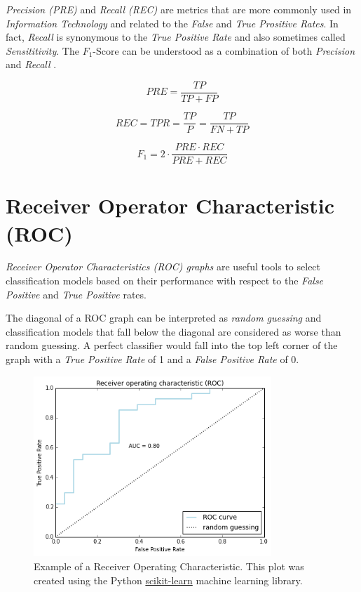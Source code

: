 \documentclass{article}
\begin{document}
\emph{Precision (PRE)} and \emph{Recall (REC)} are metrics that are more commonly used in \emph{Information Technology} and related to the \emph {False} and \emph{True Prositive Rates}. In fact, \emph{Recall} is synonymous to the \emph{True Positive Rate} and also sometimes called \emph{Sensititivity}. The $F_1$-Score can be understood as a combination of both \emph{Precision} and \emph{Recall} \cite{goutte2005probabilistic}.

\begin{equation} PRE = \frac{TP}{TP + FP} \end{equation}

\begin{equation} REC = TPR = \frac{TP}{P} =  \frac{TP}{FN + TP} \end{equation}

\begin{equation} F_1 = 2 \cdot \frac{PRE \cdot REC}{PRE + REC}\end{equation}


\section{Receiver Operator Characteristic (ROC)}

\emph{Receiver Operator Characteristics (ROC) graphs} are useful tools to select classification models based on their performance with respect to the \emph{False Positive} and \emph{True Positive} rates. 


The diagonal of a ROC graph can be interpreted as \emph{random guessing} and classification models that fall below the diagonal are considered as worse than random guessing. A perfect classifier would fall into the top left corner of the graph with a \emph{True Positive Rate} of 1 and a  \emph{False Positive Rate} of 0.

\begin{figure}[h!]
    \centering
    \includegraphics[width=0.8\textwidth]{./plot/roc.png}
    \caption{Example of a Receiver Operating Characteristic. This plot was created using the Python \href{http://scikit-learn.org/stable/auto_examples/plot_roc.html}{scikit-learn} machine learning library.}

\end{figure}
\end{document}
